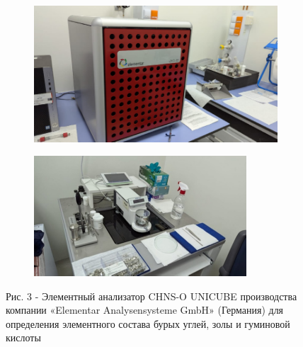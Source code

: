 \begin{figure}[H]
    \centering
    \begin{subfigure}[b]{0.45\textwidth}
        \centering
        \includegraphics[width=\textwidth]{media/gorn3/image10}
    \end{subfigure}
    \begin{subfigure}[b]{0.45\textwidth}
        \centering
        \includegraphics[width=\textwidth]{media/gorn3/image11}
    \end{subfigure}
    \caption*{Рис. 3 - Элементный анализатор CHNS-O UNICUBE производства компании «Elementar Analysensysteme GmbH» (Германия) для определения элементного состава бурых углей, золы и гуминовой кислоты}
\end{figure}

